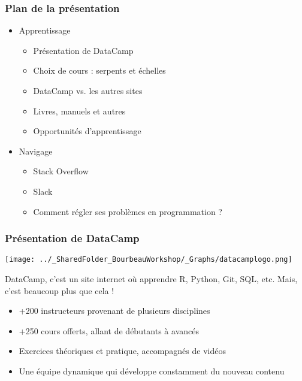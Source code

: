 \documentclass{beamer}
\begin{document}
    \begin{frame}
    
        \frametitle{Plan de la présentation} \vspace{1cm}
        
        \begin{itemize}
        
        \item{Apprentissage}
        
          \begin{itemize}
            \item Présentation de DataCamp 
            \item Choix de cours : serpents et échelles
            \item DataCamp vs. les autres sites
            \item Livres, manuels et autres 
            \item Opportunités d'apprentissage
          \end{itemize}
        
         \item{Navigage}
         
          \begin{itemize}
            \item{Stack Overflow}
            \item{Slack}
            \item{Comment régler ses problèmes en programmation ?}
          \end{itemize}
          
        \end{itemize}
        
    \end{frame}


    \begin{frame}
    
      \frametitle{Présentation de DataCamp} \vspace{1cm}
      
        \begin{center}
         \texttt{[image: ../\_SharedFolder\_BourbeauWorkshop/\_Graphs/datacamplogo.png]}
        \end{center} 
      
    DataCamp, c'est un site internet où apprendre R, Python, Git, SQL, etc. Mais, c'est beaucoup plus que cela !
    
        \begin{itemize}
          \item{+200 instructeurs provenant de plusieurs disciplines}
          \item{+250 cours offerts, allant de débutants à avancés}
          \item{Exercices théoriques et pratique, accompagnés de vidéos}
          \item{Une équipe dynamique qui développe constamment du nouveau contenu}
        \end{itemize}
          
    \end{frame}
    
\end{document}
